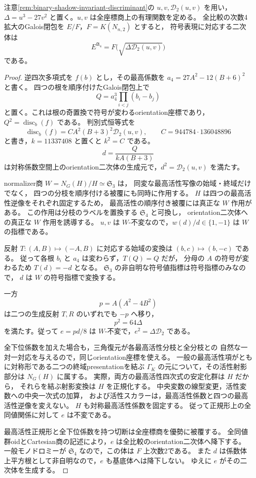 \begin{proposition}[全比較の符号二次体]
\label{prop:degree-two-monodromy-sign-field}
注意\ref{rem:binary-shadow-invariant-discriminant}の $u,v,\mathscr D_2(u,v)$ を用い，
$\Delta=u^3-27v^2$ と置く。$u,v$ は全座標商上の有理関数を定める。
全比較の次数4拡大のGalois閉包を $E/F$，$F=K(N_{n,2})$ とすると，
符号表現に対応する二次体は
\[
              E^{\mathfrak A_4}=F\bigl(\sqrt{\Delta \mathscr D_2(u,v)}\bigr)
\]
である。
\end{proposition}
\begin{proof}
逆四次多項式を $f(b)$ とし，その最高係数を
$a_4=27A^2-12(B+6)^2$ と書く。
四つの根を順序付けたGalois閉包上で
\[
 Q=a_4^3\prod_{i<j}(b_i-b_j)
\]
と置く。これは根の奇置換で符号が変わるorientation座標であり，
$Q^2=\operatorname{disc}_b(f)$ である。
判別式恒等式を
\[
 \operatorname{disc}_b(f)=C A^2(B+3)^2\mathscr D_2(u,v),\qquad
 C=944784\cdot136048896
\]
と書き，$k=11337408$ と置くと $k^2=C$ である。
\[
                    d=\frac{Q}{kA(B+3)}
\]
は対称係数空間上のorientation二次体の生成元で，$d^2=\mathscr D_2(u,v)$ を満たす。

normalizer商 $W=N_G(H)/H\simeq\mathfrak S_3$ は，
同変な最高活性写像の始域・終域だけでなく，
四つの分枝を順序付ける被覆にも同時に作用する。
$H$ は四つの最高活性逆像をそれぞれ固定するため，
最高活性の順序付き被覆には真正な $W$ 作用がある。
この作用は分枝のラベルを置換する $\mathfrak S_4$ と可換し，
orientation二次体への真正な $W$ 作用を誘導する。
$u,v$ は $W$-不変なので，$w(d)/d\in\{1,-1\}$ は $W$ の指標である。

反射 $T:(A,B)\mapsto(-A,B)$ に対応する始域の変換は
$(b,c)\mapsto(b,-c)$ である。
従って各根 $b_i$ と $a_4$ は変わらず，$T(Q)=Q$ だが，
分母の $A$ の符号が変わるため $T(d)=-d$ となる。
$\mathfrak S_3$ の非自明な符号値指標は符号指標のみなので，
$d$ は $W$ の符号指標で変換する。

一方
\[
              p=A(A^2-4B^2)
\]
は二つの生成反射 $T,R$ のいずれでも $-p$ へ移り，
\[
                         p^2=64\Delta
\]
を満たす。従って $e=pd/8$ は $W$-不変で，$e^2=\Delta\mathscr D_2$ である。

全下位係数を加えた場合も，三角復元が各最高活性分枝と全分枝との
自然な一対一対応を与えるので，同じorientation座標を使える。
一般の最高活性項がともに対称形である二つの終域presentationを結ぶ
$\Gamma_K$ の元について，その活性射影部分は $N_G(H)$ に属する。
実際，両方の最高活性四次式の安定化群は $H$ だから，
それらを結ぶ射影変換は $H$ を正規化する。
中央変数の線型変更，活性変数への中央一次式の加算，
および活性スカラーは，最高活性係数と四つの最高活性逆像を変えない。
$H$ も対称最高活性係数を固定する。
従って正規形上の全同値関係に対して $e$ は不変である。

最高活性正規形と全下位係数を持つ切断は全座標商を優勢に被覆する。
全同値群oidとCartesian商の記述により，$e$ は全比較のorientation二次体へ降下する。
一般モノドロミーが $\mathfrak S_4$ なので，この体は $F$ 上次数2である。
また $d$ は係数体上平方根として非自明なので，$e$ も基底体へは降下しない。
ゆえに $e$ がその二次体を生成する。
\end{proof}

